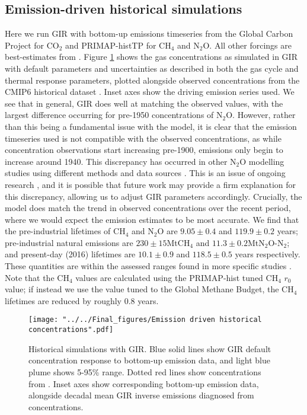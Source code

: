 \documentclass[gmd, manuscript]{copernicus}
\begin{document}
\subsection*{Emission-driven historical simulations}
Here we run GIR with bottom-up emissions timeseries from the Global Carbon Project for CO$_2$ \citep{Quere2018} and PRIMAP-histTP \citep{Gutschow2016} for CH$_4$ and N$_2$O. All other forcings are best-estimates from \cite{Forster2013}. Figure \ref{fig:historicalconcs} shows the gas concentrations as simulated in GIR with default parameters and uncertainties as described in both the gas cycle and thermal response parameters, plotted alongside observed concentrations from the CMIP6 historical dataset \citep{Meinshausen2017}. Inset axes show the driving emission series used. We see that in general, GIR does well at matching the observed values, with the largest difference occurring for pre-1950 concentrations of N$_2$O. However, rather than this being a fundamental issue with the model, it is clear that the emission timeseries used is not compatible with the observed concentrations, as while concentration observations start increasing pre-1900, emissions only begin to increase around 1940. This discrepancy has occurred in other N$_2$O modelling studies using different methods and data sources \citep{Saikawa2014}. This is an issue of ongoing research \citep{Tian2018}, and it is possible that future work may provide a firm explanation for this discrepancy, allowing us to adjust GIR parameters accordingly. Crucially, the model does match the trend in observed concentrations over the recent period, where we would expect the emission estimates to be most accurate. We find that the pre-industrial lifetimes of CH$_4$ and N$_2$O are $9.05 \pm 0.4$ and $119.9 \pm 0.2$ years; pre-industrial natural emissions are $230 \pm 15$MtCH$_4$ and $11.3 \pm 0.2$MtN$_2$O-N$_2$; and present-day (2016) lifetimes are $10.1 \pm 0.9$ and $118.5 \pm 0.5$ years respectively. These quantities are within the assessed ranges found in more specific studies \citep{Prather2012,Prather2015,Holmes2013,Kirschke2013,Davidson2014,Arora2018}. Note that the CH$_4$ values are calculated using the PRIMAP-hist tuned CH$_4$ $r_0$ value; if instead we use the value tuned to the Global Methane Budget, the CH$_4$ lifetimes are reduced by roughly 0.8 years.
\begin{figure}[t]
    \texttt{[image: "../../Final\_figures/Emission driven historical concentrations".pdf]}
    \caption{Historical simulations with GIR. Blue solid lines show GIR default concentration response to bottom-up emission data, and light blue plume shows 5-95\% range. Dotted red lines show concentrations from \citeauthor{Meinshausen2017}. Inset axes show corresponding bottom-up emission data, alongside decadal mean GIR inverse emissions diagnosed from \citeauthor{Meinshausen2017} concentrations.}
    \label{fig:historicalconcs}
\end{figure}
\end{document}
